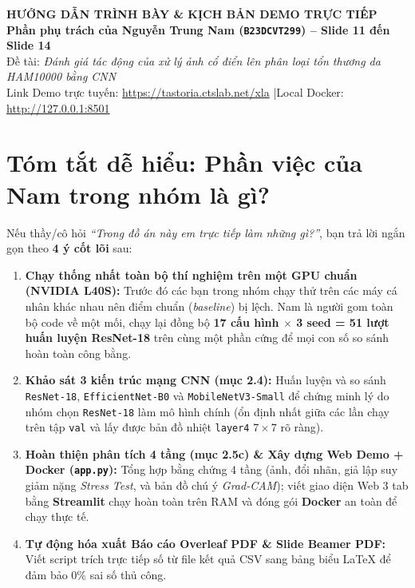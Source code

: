 \documentclass[11pt,a4paper]{article}
\begin{document}
\sloppy

\begin{center}
    {\LARGE \bfseries \color{ptitred} HƯỚNG DẪN TRÌNH BÀY \& KỊCH BẢN DEMO TRỰC TIẾP}\\[4pt]
    {\normalsize \textbf{Phần phụ trách của Nguyễn Trung Nam (\texttt{B23DCVT299}) -- Slide 11 đến Slide 14}}\\[2pt]
    {\small Đề tài: \emph{Đánh giá tác động của xử lý ảnh cổ điển lên phân loại tổn thương da HAM10000 bằng CNN}}\\
    {\footnotesize Link Demo trực tuyến: \url{https://tastoria.ctslab.net/xla} \quad|\quad Local Docker: \url{http://127.0.0.1:8501}}
\end{center}
\vspace{-4pt}

\section{Tóm tắt dễ hiểu: Phần việc của Nam trong nhóm là gì?}

Nếu thầy/cô hỏi \emph{``Trong đồ án này em trực tiếp làm những gì?''}, bạn trả lời ngắn gọn theo \textbf{4 ý cốt lõi} sau:

\begin{enumerate}
    \item \textbf{Chạy thống nhất toàn bộ thí nghiệm trên một GPU chuẩn (NVIDIA L40S):}
    Trước đó các bạn trong nhóm chạy thử trên các máy cá nhân khác nhau nên điểm chuẩn (\emph{baseline}) bị lệch. Nam là người gom toàn bộ code về một mối, chạy lại đồng bộ \textbf{17 cấu hình $\times$ 3 seed = 51 lượt huấn luyện ResNet-18} trên cùng một phần cứng để mọi con số so sánh hoàn toàn công bằng.
    \item \textbf{Khảo sát 3 kiến trúc mạng CNN (mục 2.4):}
    Huấn luyện và so sánh \texttt{ResNet-18}, \texttt{EfficientNet-B0} và \texttt{MobileNetV3-Small} để chứng minh lý do nhóm chọn \texttt{ResNet-18} làm mô hình chính (ổn định nhất giữa các lần chạy trên tập \texttt{val} và lấy được bản đồ nhiệt \texttt{layer4} $7\times 7$ rõ ràng).
    \item \textbf{Hoàn thiện phân tích 4 tầng (mục 2.5c) \& Xây dựng Web Demo + Docker (\texttt{app.py}):}
    Tổng hợp bằng chứng 4 tầng (ảnh, đổi nhãn, giả lập suy giảm nặng \emph{Stress Test}, và bản đồ chú ý \emph{Grad-CAM}); viết giao diện Web 3 tab bằng \textbf{Streamlit} chạy hoàn toàn trên RAM và đóng gói \textbf{Docker} an toàn để chạy thực tế.
    \item \textbf{Tự động hóa xuất Báo cáo Overleaf PDF \& Slide Beamer PDF:}
    Viết script trích trực tiếp số từ file kết quả CSV sang bảng biểu LaTeX để đảm bảo 0\% sai số thủ công.
\end{enumerate}
\end{document}
